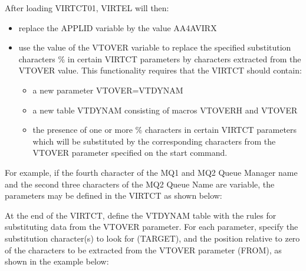 \documentclass[letterpaper,10pt,english]{sphinxmanual}
\begin{document}
After loading VIRTCT01, VIRTEL will then:
\begin{itemize}
\item {} 
replace the APPLID variable by the value AA4AVIRX

\item {} 
use the value of the VTOVER variable to replace the specified substitution characters \% in certain VIRTCT parameters by characters extracted from the VTOVER value. This functionality requires that the VIRTCT should contain:
\begin{itemize}
\item {} 
a new parameter VTOVER=VTDYNAM

\item {} 
a new table VTDYNAM consisting of macros VTOVERH and VTOVER

\item {} 
the presence of one or more \% characters in certain VIRTCT parameters which will be substituted by the corresponding characters from the VTOVER parameter specified on the start command.

\end{itemize}

\end{itemize}

For example, if the fourth character of the MQ1 and MQ2 Queue Manager name and the second three characters of the MQ2 Queue Name are variable, the parameters may be defined in the VIRTCT as shown below:

\begin{sphinxVerbatim}[commandchars=\\\{\}]
               
        
         
\end{sphinxVerbatim}

At the end of the VIRTCT, define the VTDYNAM table with the rules for substituting data from the VTOVER parameter. For each parameter, specify the substitution character(s) to look for (TARGET), and the position relative to zero of the characters to be extracted from the VTOVER parameter (FROM), as shown in the example below:
\end{document}
